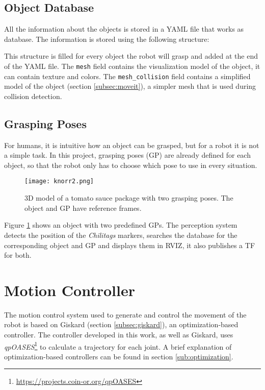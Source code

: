 \subsection{Object Database}
\label{sec:db}
All the information about the objects is stored in a YAML file that works as database. The information is stored using the following structure:



This structure is filled for every object the robot will grasp and added at the end of the YAML file. The \texttt{mesh} field contains the visualization model of the object, it can contain texture and colors. The \texttt{mesh\_collision} field contains a simplified model of the object (section \ref{subsec:moveit}), a simpler mesh that is used during collision detection.

\subsection{Grasping Poses}

For humans, it is intuitive how an object can be grasped, but for a robot it is not a simple task. In this project, grasping poses (GP) are already defined for each object, so that the robot only has to choose which pose to use in every situation.
\begin{figure}[H]
	\centering
		{\texttt{[image: knorr2.png]}}
	\vspace{-12pt}
	\caption[Grasping poses]{3D model of a tomato sauce package with two grasping poses. The object and GP have reference frames.}
	\vspace{-10pt}
	\label{fig:knorr}
\end{figure}

Figure \ref{fig:knorr} shows an object with two predefined GPs. The perception system detects the position of the \textit{Chilitags} markers, searches the database for the corresponding object and GP and displays them in RVIZ, it also publishes a TF for both.


\section{Motion Controller}
\label{sec:motion_controller}

The motion control system used  to generate and control the movement of the robot is based on Giskard (section \ref{subsec:giskard}), an optimization-based controller. The controller developed in this work, as well as Giskard, uses \textit{qpOASES}\footnote{\url{https://projects.coin-or.org/qpOASES}}  to calculate a trajectory for each joint. A brief explanation of optimization-based controllers can be found in section \ref{sub:optimization}.

